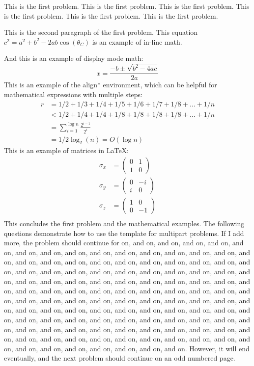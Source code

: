 \documentclass{cisXXX} %
\begin{document}
\maketitle
\HWproblem
This is the first problem.
This is the first problem.
This is the first problem.
This is the first problem.
This is the first problem.
This is the first problem.

This is the second paragraph of the first problem. This equation $c^2 = a^2 + b^2 - 2ab \cos(\theta_C)$ is an example of in-line math.

And this is an example of display mode math:
$$x = \frac{-b \pm \sqrt{b^2 - 4ac}}{2a}$$
This is an example of the align* environment, which can be helpful for mathematical expressions with multiple steps:
\begin{align*}
r &= 1/2 + 1/3 + 1/4 + 1/5 + 1/6 + 1/7 + 1/8 + \ldots + 1/n\\
&< 1/2 + 1/4 + 1/4 + 1/8 + 1/8 + 1/8 + 1/8 + \ldots + 1/n\\
&= \sum_{i = 1}^{\log n} \frac{2^{i - 1}}{2^i}\\
&= 1/2 \log_2 (n) = O(\log n)
\end{align*}
This is an example of matrices in \LaTeX:
\begin{align*}
	\sigma_x &=
		\begin{pmatrix}
		0 & 1 \\
		1 & 0
		\end{pmatrix} \\
	\sigma_y &=
		\begin{pmatrix}
		0 & -i \\
		i & 0
		\end{pmatrix} \\
	\sigma_z &=
		\begin{pmatrix}
		1 & 0 \\
		0 & -1
		\end{pmatrix} \\
\end{align*}
This concludes the first problem and the mathematical examples. The following questions demonstrate how to use the template for multipart problems.  If I add more, the problem should continue for on, and on, and on, and on, and on, and on, and on, and on, and on, and on, and on, and on, and on, and on, and on, and on, and on, and on, and on, and on, and on, and on, and on, and on, and on, and on, and on, and on, and on, and on, and on, and on, and on, and on, and on, and on, and on, and
on, and on, and on, and on, and on, and on, and on, and on, and on, and on, and on, and on, and on, and on, and on, and on, and on, and on, and on, and on, and on, and on, and on, and on, and on, and on, and on, and on, and on, and on, and on, and on, and on, and on, and on, and on, and on, and on, and on, and on, and on, and on, and on, and on, and on, and on, and on, and on, and on, and on, and on, and on, and on, and on, and on, and on, and on, and on, and on, and on, and on, and on,
and on, and on, and on, and on, and on, and on, and on, and on, and on, and on, and on, and on, and on, and on.
\newline\newline However, it will end eventually, and the next problem should continue on an odd numbered page. 
\end{document}
